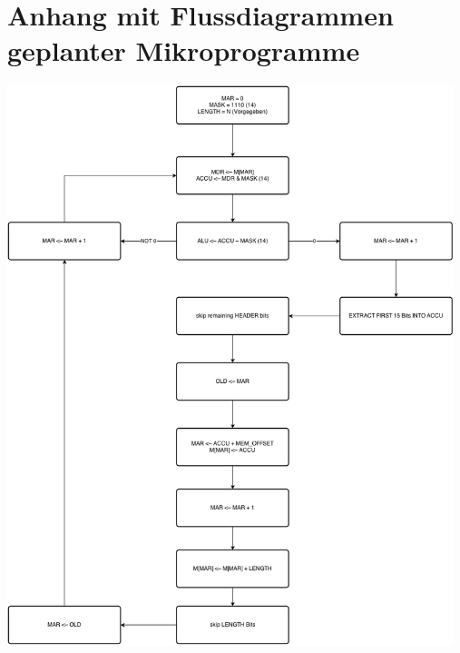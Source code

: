 \documentclass[12pt,titlepage]{article}
\begin{document}
\section{Anhang mit Flussdiagrammen \\ geplanter Mikroprogramme}

\includegraphics[width=13cm]{algo_flow.png}
\end{document}
